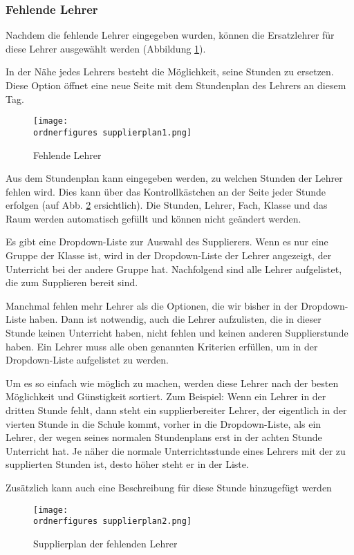 \subsubsection{Fehlende Lehrer}
Nachdem die fehlende Lehrer eingegeben wurden, können die Ersatzlehrer für diese Lehrer ausgewählt werden (Abbildung \ref{fi:fehlendeLehrer}).

In der Nähe jedes Lehrers besteht die Möglichkeit, seine Stunden zu ersetzen. Diese Option öffnet eine neue Seite mit dem Stundenplan des Lehrers an diesem Tag.

\begin{figure}[H]
	\centering
	\texttt{[image: \\ordnerfigures supplierplan1.png]}
	\caption{Fehlende Lehrer}
	\label{fi:fehlendeLehrer}
\end{figure}

Aus dem Stundenplan kann eingegeben werden, zu welchen Stunden der Lehrer fehlen wird. Dies kann über das Kontrollkästchen an der Seite jeder Stunde erfolgen (auf Abb. \ref{fi:supplieren} ersichtlich). Die Stunden, Lehrer, Fach, Klasse und das Raum werden automatisch gefüllt und können nicht geändert werden.

Es gibt eine Dropdown-Liste zur Auswahl des Supplierers. Wenn es nur eine Gruppe der Klasse ist, wird in der Dropdown-Liste der Lehrer angezeigt, der Unterricht bei der andere Gruppe hat. Nachfolgend sind alle Lehrer aufgelistet, die zum Supplieren bereit sind. 

Manchmal fehlen mehr Lehrer als die Optionen, die wir bisher in der Dropdown-Liste haben. Dann ist notwendig, auch die Lehrer aufzulisten, die in dieser Stunde keinen Unterricht haben, nicht fehlen und keinen anderen Supplierstunde haben. Ein Lehrer muss alle oben genannten Kriterien erfüllen, um in der Dropdown-Liste aufgelistet zu werden.

Um es so einfach wie möglich zu machen, werden diese Lehrer nach der besten Möglichkeit und Günstigkeit sortiert. Zum Beispiel:  Wenn ein Lehrer in der dritten Stunde fehlt, dann steht ein supplierbereiter Lehrer, der eigentlich in der vierten Stunde in die Schule kommt, vorher in die Dropdown-Liste, als ein Lehrer, der wegen seines normalen Stundenplans erst in der achten Stunde Unterricht hat. Je näher die normale Unterrichtsstunde eines Lehrers mit der zu supplierten Stunden ist, desto höher steht er in der Liste.

Zusätzlich kann auch eine Beschreibung für diese Stunde hinzugefügt werden

\begin{figure}[H]
	\centering
	\texttt{[image: \\ordnerfigures supplierplan2.png]}
	\caption{Supplierplan der fehlenden Lehrer}
	\label{fi:supplieren}
\end{figure} 

